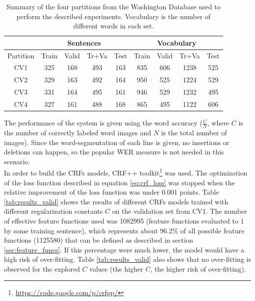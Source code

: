 \documentclass[10pt,a4paper]{article}
\begin{document}
\begin{table}[h]
\centering
\begin{tabular}{|c|c|c|c|c|c|c|c|c|}
\hline
 & \multicolumn{4}{|c|}{Sentences} & \multicolumn{4}{|c|}{Vocabulary} \\
\hline
Partition & Train & Valid & Tr+Va & Test & Train & Valid & Tr+Va & Test \\
\hline
CV1 & 325 & 168 & 493 & 163 & 835 & 606 & 1238 & 525 \\
CV2 & 329 & 163 & 492 & 164 & 950 & 525 & 1224 & 529 \\
CV3 & 331 & 164 & 495 & 161 & 946 & 529 & 1232 & 495 \\
CV4 & 327 & 161 & 488 & 168 & 865 & 495 & 1122 & 606 \\
\hline
\end{tabular}
\caption{Summary of the four partitions from the Washington Database used to perform the described experiments. Vocabulary is the number of different words in each set.}
\label{tab:data}
\end{table}

The performance of the system is given using the word accuracy ($\frac{C}{N}$, where $C$ is the number of correctly labeled word images and $N$ is the total number of images). Since the word-segmentation of each line is given, no insertions or deletions can happen, so the popular WER measure is not needed in this scenario.\\

In order to build the CRFs models, CRF++ toolkit\footnote{\url{https://code.google.com/p/crfpp/}} was used. The optimization of the loss function described in equation \ref{eq:crf_loss} was stopped when the relative improvement of the loss function was under 0.001 points. Table \ref{tab:results_valid} shows the results of different CRFs models trained with different regularization constants $C$ on the validation set from CV1. The number of effective feature functions used was 1082995 (feature functions evaluated to 1 by some training sentence), which represents about 96.2\% of all possible feature functions (1125580) that can be defined as described in section \ref{sec:feature_funcs}. If this percentage were much lower, the model would have a high risk of over-fitting. Table \ref{tab:results_valid} also shows that no over-fitting is observed for the explored $C$ values (the higher $C$, the higher risk of over-fitting).\\
\end{document}
